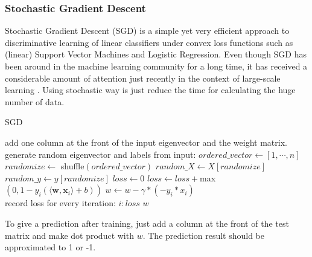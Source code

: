 \documentclass[9pt,shortpaper,twoside,web]{ieeecolor}
\begin{document}
\subsubsection{Stochastic Gradient Descent}
Stochastic Gradient Descent (SGD) is a simple yet very efficient approach to discriminative learning of linear classifiers under convex loss functions such as (linear) Support Vector Machines and Logistic Regression. Even though SGD has been around in the machine learning community for a long time, it has received a considerable amount of attention just recently in the context of large-scale learning \cite{scikit-learn}. Using stochastic way is just reduce the time for calculating the huge number of data.
\begin{algorithm}
\caption{SGD}
\begin{algorithmic} [1]
\STATE add one column at the front of the input eigenvector and the weight matrix.\\
generate random eigenvector and labels from input:
\STATE $ordered\_vector \gets [1, \cdots, n]$
\STATE $randomize\gets$ shuffle$(ordered\_vector)$
\STATE $random\_X\gets X[randomize]$
\STATE $random\_y\gets y[randomize]$
\STATE $loss\gets 0$
\STATE $loss \gets loss + $max$(0, 1-y_i(\langle\textbf{w}, \textbf{x}_i\rangle + b))$
\STATE $w \gets w - \gamma * (-y_i * x_i)$
\ENDIF
\\record loss for every iteration:
\PRINT $i: loss$
\ENDFOR
\ENDFOR
\RETURN $w$
\end{algorithmic}
\end{algorithm}

To give a prediction after training, just add a column at the front of the test matrix and make dot product with $w$. The prediction result should be approximated to 1 or -1.
\bigskip
\end{document}
